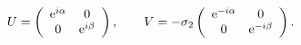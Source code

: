 \begin{equation}
U=
\left(\begin{array}{cc}
 {\rm e}^{i\alpha} & 0 \\
 0                 & {\rm e}^{i\beta} 
 \end{array}\right), 
\qquad 
V
=
- \sigma_2 
\left(\begin{array}{cc}
 {\rm e}^{-i\alpha} & 0 \\
 0                 & {\rm e}^{-i\beta} 
 \end{array}\right). 
\end{equation}

